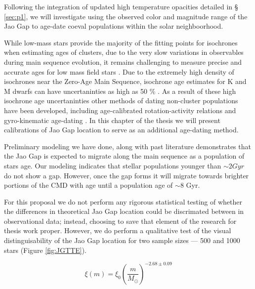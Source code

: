 Following the integration of updated high temperature opacities detailed in \S
\ref{sec:p1}, we will investigate using the observed color and magnitude range
of the Jao Gap to age-date coeval populations within the solar neighboorhood.

While low-mass stars provide the majority of the fitting points for isochrones
when estimating ages of clusters, due to the very slow variations in
observables during main sequence evolution, it remains challenging to measure
precise and accurate ages for low mass field stars \citep{Soderblom2010,
Veyette2018, Kiman2021}. Due to the extremely high density of isochrones near
the Zero-Age Main Sequence, isochrone age estimates for K and M dwarfs can have
uncertaninties as high as 50 \% \citep{Lu2021}. As a result of these high isochrone age
uncertaninties other methods of dating non-cluster populations have been
developed, including age-calibrated rotation-activity relations
\citep[e.g.][]{Kiman2021} and gyro-kinematic age-dating
\citep[e.g.][]{Lu2021}. In this chapter of the thesis we will present
calibrations of Jao Gap location to serve as an additional age-dating method.

Preliminary modeling we have done, along with past literature
\citep[e.g.][]{Jao2018,Jao2020,Feiden2021,Mansfield2021} demonstrates that the
Jao Gap is expected to migrate along the main sequence as a population of stars
age. Our modeling indicates that stellar populations younger than $\sim 2 Gyr$
do not show a gap. However, once the gap forms it will migrate towards brighter
portions of the CMD with age until a population age of $\sim 8$ Gyr.

For this proposal we do not perform any rigorous statistical testing of whether
the differences in theoretical Jao Gap location could be discrimated between in
observational data; instead, choosing to save that element of the research for
thesis work proper. However, we do perform a qualitative test of the visual
distinguisability of the Jao Gap location for two sample sizes --- 500 and 1000
stars (Figure \ref{fig:JGTTE}).

\begin{equation}\label{eqn:IMF}
	\xi(m) = \xi_{0}\left(\frac{m}{M_{\odot}}\right)^{-2.68\pm0.09}
\end{equation}

